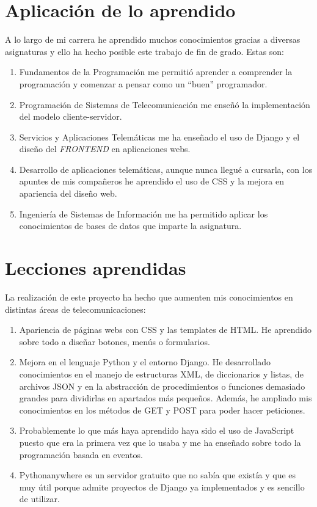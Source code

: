 \documentclass[a4paper, 12pt]{book}
\begin{document}
\section{Aplicación de lo aprendido}
\label{sec:aplicacion}

A lo largo de mi carrera he aprendido muchos conocimientos gracias a diversas asignaturas y ello ha hecho posible este trabajo de fin de grado. Estas son:

\begin{enumerate}
\item Fundamentos de la Programación me permitió aprender a comprender la programación y comenzar a pensar como un ``buen'' programador.
\item Programación de Sistemas de Telecomunicación me enseñó la implementación del modelo cliente-servidor.
  \item Servicios y Aplicaciones Telemáticas me ha enseñado el uso de Django y el diseño del \textit{FRONTEND} en aplicaciones webs.
  \item Desarrollo de aplicaciones telemáticas, aunque nunca llegué a cursarla, con los apuntes de mis compañeros he aprendido el uso de CSS y la mejora en apariencia del diseño web. 
  \item Ingeniería de Sistemas de Información me ha permitido aplicar los conocimientos de bases de datos que imparte la asignatura.
\end{enumerate}

\section{Lecciones aprendidas}
\label{sec:lecciones_aprendidas}
La realización de este proyecto ha hecho que aumenten mis conocimientos en distintas áreas de telecomunicaciones:

\begin{enumerate}
  \item Apariencia  de páginas webs con CSS y las templates de HTML. He aprendido sobre todo a diseñar botones, menús o formularios.
  \item Mejora en el lenguaje Python y el entorno Django. He desarrollado conocimientos en el manejo de estructuras XML, de diccionarios y listas, de archivos JSON y en la abstracción de procedimientos o funciones demasiado grandes para dividirlas en apartados más pequeños. Además, he ampliado mis conocimientos en los métodos de GET y POST para poder hacer peticiones.
  \item Probablemente lo que más haya aprendido haya sido el uso de JavaScript puesto que era la primera vez que lo usaba y me ha enseñado sobre todo la programación basada en eventos.
  \item Pythonanywhere es un servidor gratuito que no sabía que existía y que es muy útil porque admite proyectos de Django ya implementados y es sencillo de utilizar.
\end{enumerate}
\end{document}
